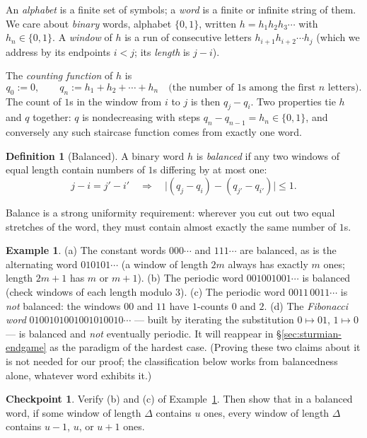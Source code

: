 \documentclass[11pt,reqno]{amsart}
\theoremstyle{plain}
\theoremstyle{definition}
\newtheorem{definition}[theorem]{Definition}
\newtheorem{example}[theorem]{Example}
\newtheorem{checkpoint}[theorem]{Checkpoint}   %
\theoremstyle{remark}
\begin{document}
An \emph{alphabet} is a finite set of symbols; a \emph{word} is a finite or infinite
string of them. We care about \emph{binary} words, alphabet $\{0, 1\}$, written
$h = h_1 h_2 h_3 \cdots$ with $h_n \in \{0,1\}$. A \emph{window} of $h$ is a run of
consecutive letters $h_{i+1} h_{i+2} \cdots h_{j}$ (which we address by its endpoints
$i < j$; its \emph{length} is $j - i$).

The \emph{counting function} of $h$ is
\[
  q_0 := 0, \qquad q_n := h_1 + h_2 + \cdots + h_n
  \quad\text{(the number of $1$s among the first $n$ letters)} .
\]
The count of $1$s in the window from $i$ to $j$ is then $q_j - q_i$. Two properties
tie $h$ and $q$ together: $q$ is nondecreasing with steps $q_n - q_{n-1} = h_n \in
\{0,1\}$, and conversely any such staircase function comes from exactly one word.

\begin{definition}[Balanced]\label{def:balanced}
A binary word $h$ is \emph{balanced} if any two windows of equal length contain
numbers of $1$s differing by at most one:
\[
  j - i = j' - i' \quad\Longrightarrow\quad
  \big| (q_j - q_i) - (q_{j'} - q_{i'}) \big| \le 1 .
\]
\end{definition}

Balance is a strong uniformity requirement: wherever you cut out two equal stretches
of the word, they must contain almost exactly the same number of $1$s.

\begin{example}\label{ex:balanced-words}
(a) The constant words $000\cdots$ and $111\cdots$ are balanced, as is the
alternating word $010101\cdots$ (a window of length $2m$ always has exactly $m$
ones; length $2m{+}1$ has $m$ or $m{+}1$).
(b) The periodic word $001001001\cdots$ is balanced (check windows of each length
modulo $3$).
(c) The periodic word $0011\,0011\cdots$ is \emph{not} balanced: the windows $00$
and $11$ have $1$-counts $0$ and $2$.
(d) The \emph{Fibonacci word} $0100101001001010010\cdots$ --- built by iterating
the substitution $0 \mapsto 01$, $1 \mapsto 0$ --- is balanced and \emph{not}
eventually periodic. It will reappear in \S\ref{sec:sturmian-endgame} as the
paradigm of the hardest case. (Proving these two claims about it is not needed for
our proof; the classification below works from balancedness alone, whatever word
exhibits it.)
\end{example}

\begin{checkpoint}
Verify (b) and (c) of Example~\ref{ex:balanced-words}. Then show that in a balanced
word, if some window of length $\Delta$ contains $u$ ones, every window of length
$\Delta$ contains $u-1$, $u$, or $u+1$ ones.
\end{checkpoint}
\end{document}
